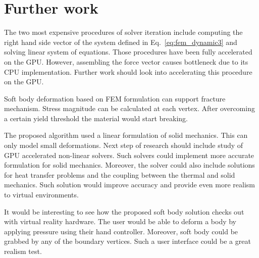 \documentclass[en]{minipw} %
\begin{document}
\section{Further work}

The two most expensive procedures of solver iteration include computing the right hand side vector of the system defined in Eq.~\ref{eq:fem_dynamic3} and solving linear system of equations. Those procedures have been fully accelerated on the GPU. However, assembling the force vector causes bottleneck due to its CPU implementation. Further work should look into accelerating this procedure on the GPU.

Soft body deformation based on FEM formulation can support fracture mechanism. Stress magnitude can be calculated at each vertex. After overcoming a certain yield threshold the material would start breaking.

The proposed algorithm used a linear formulation of solid mechanics. This can only model small deformations. Next step of research should include study of GPU accelerated non-linear solvers. Such solvers could implement more accurate formulation for solid mechanics. Moreover, the solver could also include solutions for heat transfer problems and the coupling between the thermal and solid mechanics. Such solution would improve accuracy and provide even more realism to virtual environments.

It would be interesting to see how the proposed soft body solution checks out with virtual reality hardware. The user would be able to deform a body by applying pressure using their hand controller. Moreover, soft body could be grabbed by any of the boundary vertices. Such a user interface could be a great realism test.
\end{document}
